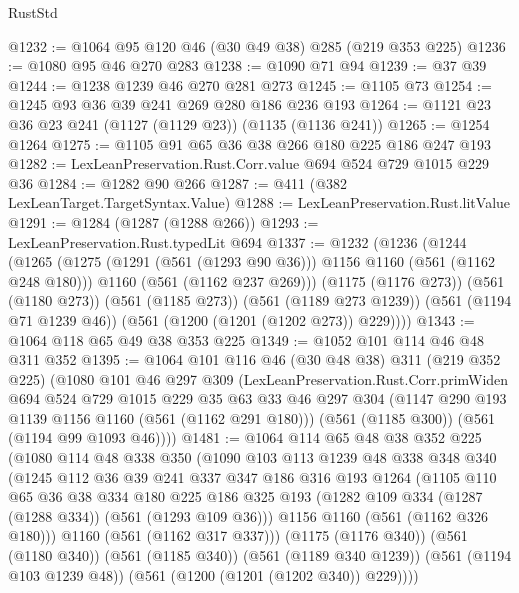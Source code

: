 \begin{lexlean}{RustStd}
\begin{coremodule}
@1232 := @1064 @95 @120 @46 (@30 @49 @38) @285 (@219 @353 @225)
@1236 := @1080 @95 @46 @270 @283
@1238 := @1090 @71 @94
@1239 := @37 @39
@1244 := @1238 @1239 @46 @270 @281 @273
@1245 := @1105 @73
@1254 := @1245 @93 @36 @39 @241 @269 @280 @186 @236 @193
@1264 := @1121 @23 @36 @23 @241 (@1127 (@1129 @23)) (@1135 (@1136 @241))
@1265 := @1254 @1264
@1275 := @1105 @91 @65 @36 @38 @266 @180 @225 @186 @247 @193
@1282 := LexLeanPreservation.Rust.Corr.value @694 @524 @729 @1015 @229 @36
@1284 := @1282 @90 @266
@1287 := @411 (@382 LexLeanTarget.TargetSyntax.Value)
@1288 := LexLeanPreservation.Rust.litValue
@1291 := @1284 (@1287 (@1288 @266))
@1293 := LexLeanPreservation.Rust.typedLit @694
@1337 := @1232
    (@1236
      (@1244
        (@1265
          (@1275 (@1291 (@561 (@1293 @90 @36))) @1156 @1160 (@561 (@1162 @248 @180)))
          @1160
          (@561 (@1162 @237 @269)))
        (@1175 (@1176 @273))
        (@561 (@1180 @273))
        (@561 (@1185 @273))
        (@561 (@1189 @273 @1239))
        (@561 (@1194 @71 @1239 @46))
        (@561 (@1200 (@1201 (@1202 @273)) @229))))
@1343 := @1064 @118 @65 @49 @38 @353 @225
@1349 := @1052 @101 @114 @46 @48 @311 @352
@1395 := @1064
    @101
    @116
    @46
    (@30 @48 @38)
    @311
    (@219 @352 @225)
    (@1080
      @101
      @46
      @297
      @309
      (LexLeanPreservation.Rust.Corr.primWiden
        @694
        @524
        @729
        @1015
        @229
        @35
        @63
        @33
        @46
        @297
        @304
        (@1147 @290 @193 @1139 @1156 @1160 (@561 (@1162 @291 @180)))
        (@561 (@1185 @300))
        (@561 (@1194 @99 @1093 @46))))
@1481 := @1064
    @114
    @65
    @48
    @38
    @352
    @225
    (@1080
      @114
      @48
      @338
      @350
      (@1090
        @103
        @113
        @1239
        @48
        @338
        @348
        @340
        (@1245
          @112
          @36
          @39
          @241
          @337
          @347
          @186
          @316
          @193
          @1264
          (@1105
            @110
            @65
            @36
            @38
            @334
            @180
            @225
            @186
            @325
            @193
            (@1282 @109 @334 (@1287 (@1288 @334)) (@561 (@1293 @109 @36)))
            @1156
            @1160
            (@561 (@1162 @326 @180)))
          @1160
          (@561 (@1162 @317 @337)))
        (@1175 (@1176 @340))
        (@561 (@1180 @340))
        (@561 (@1185 @340))
        (@561 (@1189 @340 @1239))
        (@561 (@1194 @103 @1239 @48))
        (@561 (@1200 (@1201 (@1202 @340)) @229))))

\end{coremodule}
\end{lexlean}
